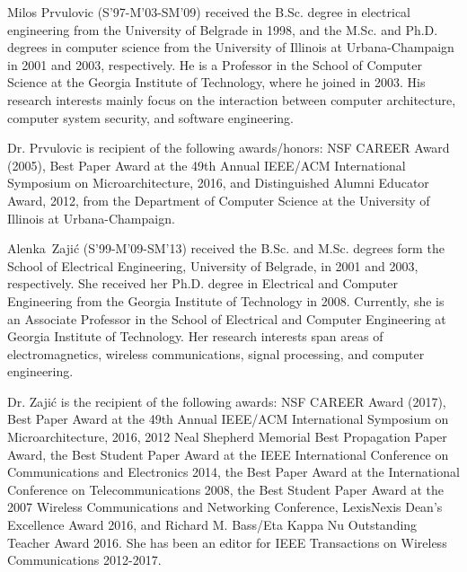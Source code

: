 \documentclass[journal]{IEEEtran}
\begin{document}
\begin{IEEEbiography}{Milos Prvulovic} (S'97-M'03-SM'09) received the B.Sc. degree in electrical engineering from the University of Belgrade in 1998, and the M.Sc. and Ph.D. degrees in computer science from the University of Illinois at Urbana-Champaign in 2001 and 2003, respectively. He is a Professor in the School of Computer Science at the Georgia Institute of Technology, where he joined in 2003. His research interests mainly focus on the interaction between computer architecture, computer system security, and software engineering.
	
Dr. Prvulovic is recipient of the following awards/honors: NSF CAREER Award (2005), Best Paper Award at the 49th Annual IEEE/ACM International Symposium on Microarchitecture, 2016, and Distinguished Alumni Educator Award, 2012, from the Department of Computer Science at the University of Illinois at Urbana-Champaign.
\end{IEEEbiography}
\vspace{-0.2in}
\begin{IEEEbiography}{Alenka~Zaji\'{c}} (S'99-M'09-SM'13)
	received the B.Sc. and M.Sc. degrees form the School of Electrical Engineering, University of Belgrade, in 2001 and 2003, respectively. She received her Ph.D. degree in Electrical and Computer Engineering from the Georgia Institute of Technology in 2008. Currently, she is an Associate Professor in the School of Electrical and Computer Engineering at Georgia Institute of Technology. Her research interests span areas of electromagnetics, wireless communications, signal processing, and computer engineering.
	
	Dr. Zaji\'{c} is the recipient of the following awards: NSF CAREER Award (2017), Best Paper Award at the 49th Annual IEEE/ACM International Symposium on Microarchitecture, 2016, 2012 Neal Shepherd Memorial Best Propagation Paper Award, the Best Student Paper Award at the IEEE International Conference on Communications and Electronics 2014, the Best Paper Award at the International Conference on Telecommunications 2008, the Best Student Paper Award at the 2007 Wireless Communications and Networking Conference, LexisNexis Dean's Excellence Award 2016, and Richard M. Bass/Eta Kappa Nu Outstanding Teacher Award 2016. She has been an editor for IEEE Transactions on Wireless Communications 2012-2017.
	
\end{IEEEbiography}
\end{document}
